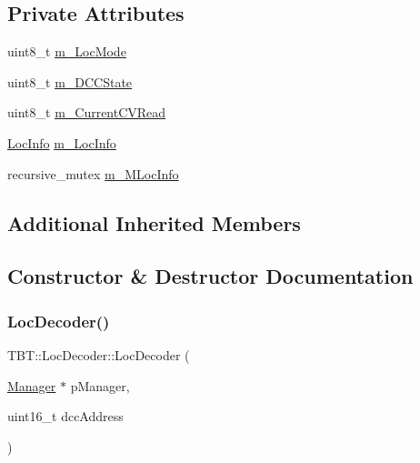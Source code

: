 \subsection*{Private Attributes}
\begin{DoxyCompactItemize}
\item 
uint8\+\_\+t \hyperlink{classTBT_1_1LocDecoder_a196fc5289b1ea2c9439b385770692c92_a196fc5289b1ea2c9439b385770692c92}{m\+\_\+\+Loc\+Mode}
\item 
uint8\+\_\+t \hyperlink{classTBT_1_1LocDecoder_a9994faf9c3dc0e84d78a9c1675fee617_a9994faf9c3dc0e84d78a9c1675fee617}{m\+\_\+\+D\+C\+C\+State}
\item 
uint8\+\_\+t \hyperlink{classTBT_1_1LocDecoder_adc6e09d951be66f20bf3e7ac57f9fde2_adc6e09d951be66f20bf3e7ac57f9fde2}{m\+\_\+\+Current\+C\+V\+Read}
\item 
\hyperlink{structTBT_1_1LocInfo}{Loc\+Info} \hyperlink{classTBT_1_1LocDecoder_a4b70da8963e4f78730443ffd27af377a_a4b70da8963e4f78730443ffd27af377a}{m\+\_\+\+Loc\+Info}
\item 
recursive\+\_\+mutex \hyperlink{classTBT_1_1LocDecoder_ae64b66588acb7e0d3084afd9eece57af_ae64b66588acb7e0d3084afd9eece57af}{m\+\_\+\+M\+Loc\+Info}
\end{DoxyCompactItemize}
\subsection*{Additional Inherited Members}


\subsection{Constructor \& Destructor Documentation}
\mbox{\label{classTBT_1_1LocDecoder_ae8563de74c15f27c40644bf8218d26d9_ae8563de74c15f27c40644bf8218d26d9}} 
\subsubsection{\texorpdfstring{Loc\+Decoder()}{LocDecoder()}}
{\footnotesize\ttfamily T\+B\+T\+::\+Loc\+Decoder\+::\+Loc\+Decoder (\begin{DoxyParamCaption}\item[{\hyperlink{classTBT_1_1Manager}{Manager} $\ast$}]{p\+Manager,  }\item[{uint16\+\_\+t}]{dcc\+Address }\end{DoxyParamCaption})}



